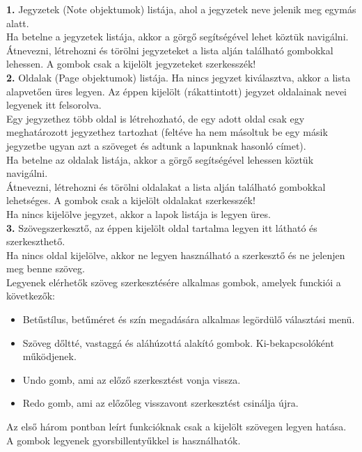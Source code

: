 \vspace{5pt} \noindent \textbf{1.} Jegyzetek (Note objektumok) listája, ahol a jegyzetek neve jelenik meg egymás alatt. 
\\Ha betelne a jegyzetek listája, akkor a görgő segítségével lehet köztük navigálni.
\\Átnevezni, létrehozni és törölni jegyzeteket a lista alján található gombokkal lehessen. A gombok csak a kijelölt jegyzeteket szerkesszék!
\vspace{5pt} \\ \textbf{2.} Oldalak (Page objektumok) listája. Ha nincs jegyzet kiválasztva, akkor a lista alapvetően üres legyen. Az éppen kijelölt (rákattintott) jegyzet oldalainak nevei legyenek itt felsorolva. 
\\Egy jegyzethez több oldal is létrehozható, de egy adott oldal csak egy meghatározott jegyzethez tartozhat (feltéve ha nem másoltuk be egy másik jegyzetbe ugyan azt a szöveget és adtunk a lapunknak hasonló címet). 
\\Ha betelne az oldalak listája, akkor a görgő segítségével lehessen köztük navigálni. 
\\Átnevezni, létrehozni és törölni oldalakat a lista alján található gombokkal lehetséges. A gombok csak a kijelölt oldalakat szerkesszék!
\\Ha nincs kijelölve jegyzet, akkor a lapok listája is legyen üres.
\vspace{5pt} \\ \textbf{3.} Szövegszerkesztő, az éppen kijelölt oldal tartalma legyen itt látható és szerkeszthető. 
\\Ha nincs oldal kijelölve, akkor ne legyen használható a szerkesztő és ne jelenjen meg benne szöveg. 
\vspace{5pt} \\Legyenek elérhetők szöveg szerkesztésére alkalmas gombok, amelyek funckiói a következők: 
\begin{itemize}
	\item Betűstílus, betűméret és szín megadására alkalmas legördülő választási menü.
	\item Szöveg dőltté, vastaggá és aláhúzottá alakító gombok. Ki-bekapcsolóként működjenek.
	\item Undo gomb, ami az előző szerkesztést vonja vissza.
	\item Redo gomb, ami az előzőleg visszavont szerkesztést csinálja újra.
\end{itemize}
Az első három pontban leírt funkcióknak csak a kijelölt szövegen legyen hatása.
\\A gombok legyenek gyorsbillentyűkkel is használhatók.


